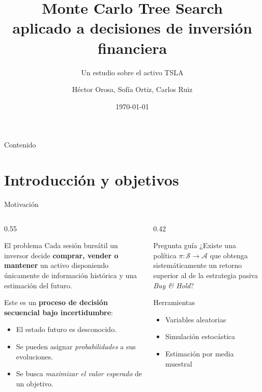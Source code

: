 \documentclass[aspectratio=169, 10pt]{beamer}
\title[MCTS Financiero]{%
  Monte Carlo Tree Search\\
  aplicado a decisiones de inversión financiera}
\subtitle{Un estudio sobre el activo TSLA}
\author{Héctor Orosa, Sofía Ortiz, Carlos Ruiz}
\institute{%
  Universitdad de Valencia\\
  Métodos Numéricos}
\date{\today}
\begin{document}

\begin{frame}
  \titlepage
\end{frame}

\begin{frame}{Contenido}
  \tableofcontents
\end{frame}

\section{Introducción y objetivos}

\begin{frame}{Motivación}
  \begin{columns}[T]
    \begin{column}{0.55\textwidth}
      \begin{block}{El problema}
        Cada sesión bursátil un inversor decide \textbf{comprar, vender o
        mantener} un activo disponiendo únicamente de información histórica
        y una estimación del futuro.
      \end{block}
      \vspace{0.4cm}
      Este es un \textbf{proceso de decisión secuencial bajo incertidumbre}:
      \begin{itemize}
        \item El estado futuro es desconocido.
        \item Se pueden asignar \emph{probabilidades} a sus evoluciones.
        \item Se busca \emph{maximizar el valor esperado} de un objetivo.
      \end{itemize}
    \end{column}
    \begin{column}{0.42\textwidth}
      \begin{alertblock}{Pregunta guía}
        ¿Existe una política $\pi:\mathcal{S}\to\mathcal{A}$ que obtenga
        sistemáticamente un retorno superior al de la estrategia pasiva
        \emph{Buy \& Hold}?
      \end{alertblock}
      \vspace{0.3cm}
      \begin{exampleblock}{Herramientas}
        \begin{itemize}
          \item Variables aleatorias
          \item Simulación estocástica
          \item Estimación por media muestral
        \end{itemize}
      \end{exampleblock}
    \end{column}
  \end{columns}
\end{frame}
\end{document}
